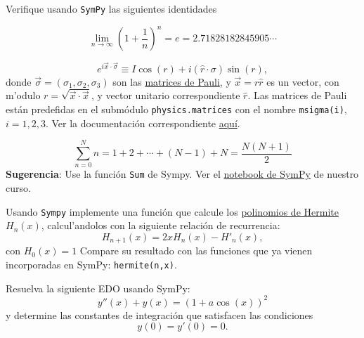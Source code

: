 \documentclass[11pt]{exam}
\begin{document}
\firstpageheadrule
\runningheadrule
{}
\cfoot{ }
\begin{flushleft}
\vspace{0.2in}

\vspace{0.25cm}
\end{flushleft}

\begin{questions}

\item Verifique usando \texttt{SymPy} las siguientes identidades
\begin{parts}
\item 
\begin{equation}
\lim_{n\to\infty}\left(1+\frac{1}{n}\right)^n = e = 2.71828182845905\cdots
\end{equation}
\item 
\begin{equation}
e^{i\vec{x}\cdot\vec{\sigma}} \equiv I\cos(r) + i(\hat{r}\cdot\sigma)\sin(r),
\end{equation}
donde $\vec\sigma = (\sigma_1,\sigma_2,\sigma_3)$ son las \href{https://es.wikipedia.org/wiki/Matrices_de_Pauli}{matrices de Pauli}, y $\vec{x}=r\hat{r}$ es un vector, con m'odulo $r = \sqrt{\vec{x}\cdot\vec{x}}$, y vector unitario correspondiente $\hat{r}$. Las matrices de Pauli están predefidas en el submódulo \texttt{physics.matrices} con el nombre \texttt{msigma(i)}, $i=1,2,3$. Ver la documentación correspondiente \href{https://docs.sympy.org/latest/modules/physics/matrices.html}{aqu\'i}.
\item 
\begin{equation}
\sum_{n=0}^N n = 1 + 2 + \cdots + (N-1) + N = \frac{N(N+1)}{2}
\end{equation}
\textbf{Sugerencia}: Use la función \texttt{Sum} de Sympy. Ver el \href{https://github.com/PythonUdeC/CPC21/blob/master/06-Sympy.ipynb}{notebook de SymPy} de nuestro curso.
\end{parts}

\item Usando \texttt{Sympy} implemente una función que calcule los \href{https://es.wikipedia.org/wiki/Polinomios_de_Hermite}{polinomios de Hermite} $H_n(x)$, calcul'andolos con la siguiente relación de recurrencia:
\begin{equation}
H_{n+1}(x) = 2x H_n(x) - H'_n(x),
\end{equation}
con $H_0(x)=1$
Compare su resultado con las funciones que ya vienen incorporadas en SymPy: \texttt{hermite(n,x)}. 

\item Resuelva la siguiente EDO usando SymPy:
\begin{equation}
y''(x)+y(x) = (1+a\cos(x))^2
\end{equation}
y determine las constantes de integración que satisfacen las condiciones
\begin{equation}
y(0)=y'(0)=0.
\end{equation}
\end{questions}
\end{document}
